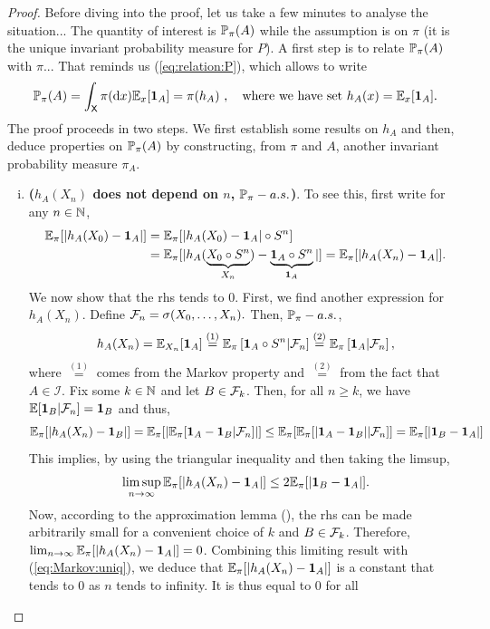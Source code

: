 \documentclass[english,graybox,envcountchap,envcountsame,sectrefs,shortlabels]{svmono}
\theoremstyle{style}
\begin{document}
\begin{proof}
Before diving into the proof, let us take a few minutes to analyse
the situation... The quantity of interest is $\mathbb{P}_{\pi}(A)$ while
the assumption is on $\pi$ (it is the unique invariant probability
measure for $P$). A first step is to relate $\mathbb{P}_{\pi}(A)$ with
$\pi$... That reminds us (\ref{eq:relation:P}), which allows to
write
\[
\mathbb{P}_{\pi}(A)=\int_{\mathsf{X}}\pi(\mathrm{d} x)\mathbb{E}_{x}[\mathbf{1}_{A}]=\pi(h_{A})\ ,\quad\mbox{where we have set }h_{A}(x)=\mathbb{E}_{x}[\mathbf{1}_{A}].
\]
The proof proceeds in two steps. We first establish some results on
$h_{A}$ and then, deduce properties on $\mathbb{P}_{\pi}(A)$ by constructing,
from $\pi$ and $A$, another invariant probability measure $\pi_{A}$.
\begin{enumerate}[(i)]
\item \textbf{($h_{A}(X_{n})$ does not depend on $n$, $\mathbb{P}_{\pi}-a.s.$)}.
To see this, first write for any $n\in\mathbb{N}$,
\begin{align}
\mathbb{E}_{\pi}[|h_{A}(X_{0})-\mathbf{1}_{A}|] & =\mathbb{E}_{\pi}[|h_{A}(X_{0})-\mathbf{1}_{A}|\circ S^{n}]\label{eq:Markov:uniq}\\
 & =\mathbb{E}_{\pi}[|h_{A}(\underbrace{X_{0}\circ S^{n}}_{X_{n}})-\underbrace{\mathbf{1}_{A}\circ S^{n}}_{\mathbf{1}_{A}}|]=\mathbb{E}_{\pi}[|h_{A}(X_{n})-\mathbf{1}_{A}|].\nonumber
\end{align}
We now show that the rhs tends to $0$. First, we find another expression
for $h_{A}(X_{n})$. Define $\mathcal{F}_{n}=\sigma(X_{0},\ldots,X_{n}).$
Then, $\mathbb{P}_{\pi}-a.s.$,
\[
h_{A}(X_{n})=\mathbb{E}_{X_{n}}[\mathbf{1}_{A}]\stackrel{(1)}{=}\mathbb{E}_{\pi}\left[\mathbf{1}_{A}\circ S^{n}|\mathcal{F}_{n}\right]\stackrel{(2)}{=}\mathbb{E}_{\pi}\left[\mathbf{1}_{A}|\mathcal{F}_{n}\right],
\]
where $\stackrel{(1)}{=}$ comes from the Markov property and $\stackrel{(2)}{=}$
from the fact that $A\in\mathcal{I}$. Fix some $k\in\mathbb{N}$ and let
$B\in\mathcal{F}_{k}$. Then, for all $n\geq k$, we have $\mathbb{E}[\mathbf{1}_{B}|\mathcal{F}_{n}]=\mathbf{1}_{B}$
and thus,
\[
\mathbb{E}_{\pi}[|h_{A}(X_{n})-\mathbf{1}_{B}|]=\mathbb{E}_{\pi}[|\mathbb{E}_{\pi}[\mathbf{1}_{A}-\mathbf{1}_{B}|\mathcal{F}_{n}]|]\leq\mathbb{E}_{\pi}[\mathbb{E}_{\pi}[|\mathbf{1}_{A}-\mathbf{1}_{B}||\mathcal{F}_{n}]]=\mathbb{E}_{\pi}[|\mathbf{1}_{B}-\mathbf{1}_{A}|]
\]
This implies, by using the triangular inequality and then taking the
limsup,
\[
\limsup_{n\to\infty}\mathbb{E}_{\pi}[|h_{A}(X_{n})-\mathbf{1}_{A}|]\leq2\mathbb{E}_{\pi}[|\mathbf{1}_{B}-\mathbf{1}_{A}|].
\]
Now, according to the approximation lemma (), the
rhs can be made arbitrarily small for a convenient choice of $k$
and $B\in\mathcal{F}_{k}$. Therefore, $\lim_{n\to\infty}\mathbb{E}_{\pi}[|h_{A}(X_{n})-\mathbf{1}_{A}|]=0$.
Combining this limiting result with (\ref{eq:Markov:uniq}), we deduce
that $\mathbb{E}_{\pi}[|h_{A}(X_{n})-\mathbf{1}_{A}|]$ is a constant that tends
to $0$ as $n$ tends to infinity. It is thus equal to $0$ for all

\end{enumerate}
\end{proof}
\end{document}
